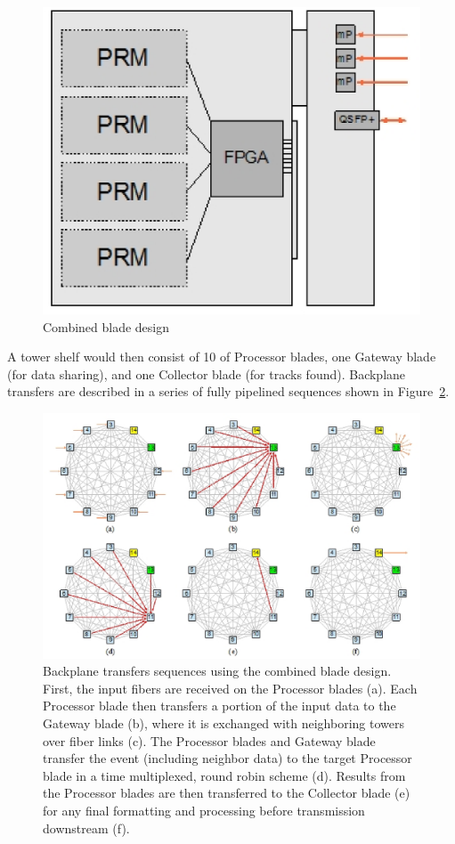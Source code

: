 \begin{figure}[ht!]
\centering
\includegraphics[width=0.45\columnwidth]{Plots/CombBlade.eps}
\caption{Combined blade design}
\label{fig:CombBlade}
\end{figure}


\noindent A tower shelf would then consist of 10 of Processor blades, one Gateway blade (for data sharing), and one Collector blade (for tracks found).  Backplane transfers are described in a series of fully pipelined sequences shown in Figure~\ref{fig:BackPlaneTr}.

\begin{figure}[ht!]
\centering
\includegraphics[width=0.85\columnwidth]{Plots/BackPlaneTr.eps}
\caption{Backplane transfers sequences using the combined blade design. First, the input fibers are received on the Processor blades (a).  Each Processor blade then transfers a portion of the input data to the Gateway blade (b), where it is exchanged with neighboring towers over fiber links (c).  The Processor blades and Gateway blade transfer the event (including neighbor data) to the target Processor blade in a time multiplexed, round robin scheme (d).   Results from the Processor blades are then transferred to the Collector blade (e) for any final formatting and processing before transmission downstream (f).}
\label{fig:BackPlaneTr}
\end{figure}
 

